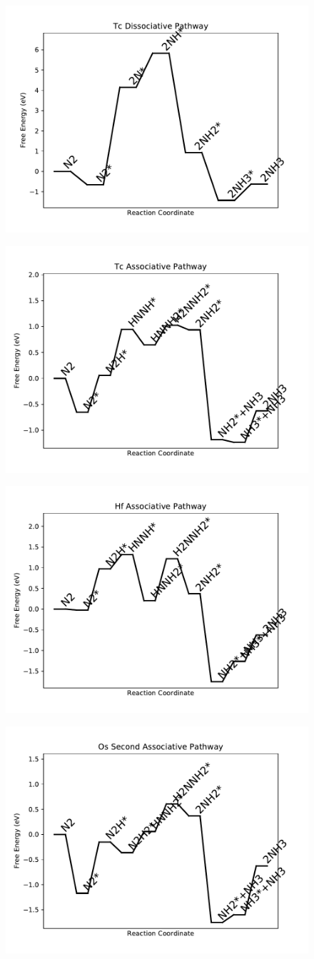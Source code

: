 \begin{figure}
\includegraphics[width=0.5\linewidth]{data/plots/Tc_dissociative.pdf}
\label{fig:Tc_dissociative}
\end{figure}

\begin{figure}
\includegraphics[width=0.5\linewidth]{data/plots/Tc_associative.pdf}
\label{fig:Tc_associative}
\end{figure}

\begin{figure}
\includegraphics[width=0.5\linewidth]{data/plots/Hf_associative.pdf}
\label{fig:Hf_associative}
\end{figure}

\begin{figure}
\includegraphics[width=0.5\linewidth]{data/plots/Os_associative_2.pdf}
\label{fig:Os_associative_2}
\end{figure}

